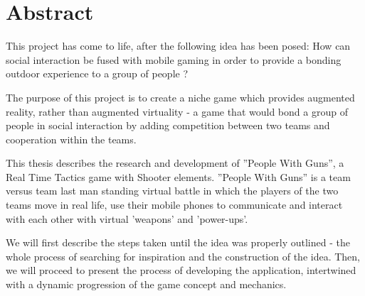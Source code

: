 \section{Abstract}

This project has come to life, after the following idea has been posed: How can
social interaction be fused with mobile gaming in order to provide a bonding
outdoor experience to a group of people ? 

The purpose of this project is to create a niche game which provides augmented
reality, rather than augmented virtuality - a game that would bond a group of
people in social interaction by adding competition between two teams and
cooperation within the teams.\newline

This thesis describes the research and development of ''People With Guns'', a
Real Time Tactics game with Shooter elements. ''People With Guns'' is a team
versus team last man standing virtual battle in which the players of the two
teams move in real life, use their mobile phones to communicate and interact
with each other with virtual 'weapons' and 'power-ups'.\newline

We will first describe the steps taken until the idea was properly outlined -
the whole process of searching for inspiration and the construction of the idea.
Then, we will proceed to present the process of developing the application,
intertwined with a dynamic progression of the game concept and
mechanics.\newline
